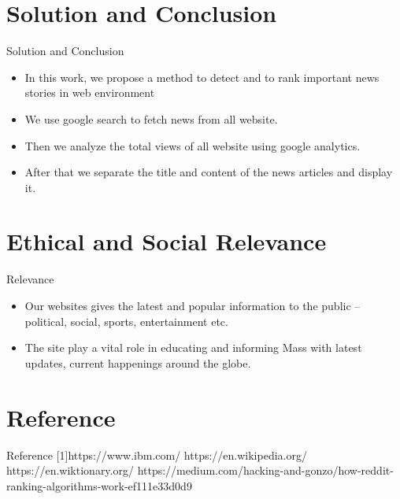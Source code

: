 \documentclass{beamer}
\begin{document}
	\section{Solution and Conclusion}
	
	\begin{frame}{Solution and Conclusion}
	\begin{itemize}
	
	\item \Large In this work, we propose a method to detect and to rank important news stories in web environment
	\item \Largeuse  We use google search to fetch news from all website.
	\item \Largeuse  Then we analyze the total views of all website using google analytics.
	\item \Largeuse  After that we separate the title and content of the news articles and display it.
	\end{itemize}
	\end{frame}
	\section{Ethical and Social Relevance}
	\begin{frame}{Relevance}
	\begin{itemize}
	    \item \Large{Our websites gives the latest and popular information to the public – political, social, sports, entertainment etc.}
	    \item \Large {The site play a vital role in educating and informing Mass with latest updates, current happenings around the globe.}
	\end{itemize}
	\end{frame}

	
	\section{Reference}
	\begin{frame}{Reference}
	    [1]https://www.ibm.com/
	    \newline\newline
	    [2]https://en.wikipedia.org/
	    \newline\newline
	    [3]https://en.wiktionary.org/
	    \newline \newline
	    [4]https://medium.com/hacking-and-gonzo/how-reddit-ranking-algorithms-work-ef111e33d0d9
	     \end{frame}
\end{document}
